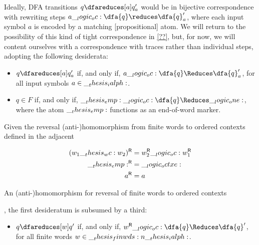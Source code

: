 Ideally, \ac{DFA} transitions $q \dfareduces[a] q'_a$ would be in bijective correspondence with rewriting steps $a \oc \dfa{q} \reduces \dfa{q}'_a$, where each input symbol $a$ is encoded by a matching [propositional] atom.
%
We will return to the possibility of this kind of tight correspondence in \cref{??}, but,
%
for now, we will content ourselves with a correspondence with traces rather than individual steps, adopting the following desiderata:
%
\begin{itemize}
\item
  $q \dfareduces[a] q'_a$ if, and only if, $a \oc \dfa{q} \Reduces \dfa{q}'_a$, for all input symbols $a \in \__thesis_ialph:$.
\item
  $q \in F$ if, and only if, $\emp \oc \dfa{q} \Reduces \one$, where the atom $\__thesis_emp:$ functions as an end-of-word marker.
\end{itemize}
Given the reversal (anti-)\-homo\-morph\-ism from finite words to ordered contexts defined in the adjacent %
\begin{marginfigure}
  \begin{align*}
    \rev*{w_1 \wc w_2} &= \rev{w_2} \oc \rev{w_1} \\
    \rev{\emp} &= \octxe \\
    \rev{a} &= a
  \end{align*}
  \caption{An (anti-)\-homo\-morph\-ism for reversal of finite words to ordered contexts}\label{fig:ordered-rewriting:reversal}
\end{marginfigure}%
, the first desideratum is subsumed by a third:
\begin{itemize}[resume*]
\item $q \dfareduces[w] q'$ if, and only if, $\rev{w} \oc \dfa{q} \Reduces \dfa{q}'$, for all finite words $w \in \__thesis_finwds:n {\__thesis_ialph:}$.
\end{itemize}

